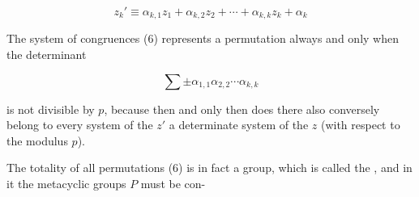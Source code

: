 \[
z_k' \equiv \alpha_{k,1}z_1 + \alpha_{k,2}z_2 + \cdots + \alpha_{k,k}z_k + \alpha_k
\]

The system of congruences (6) represents a permutation always and only when the determinant

\[
\sum \pm \alpha_{1,1}\alpha_{2,2}\cdots\alpha_{k,k}
\]

is not divisible by $p$, because then and only then does there also conversely belong to every system of the $z'$ a determinate system of the $z$ (with respect to the modulus $p$).

The totality of all permutations (6) is in fact a group, which is called the , and in it the metacyclic groups $P$ must be con-
